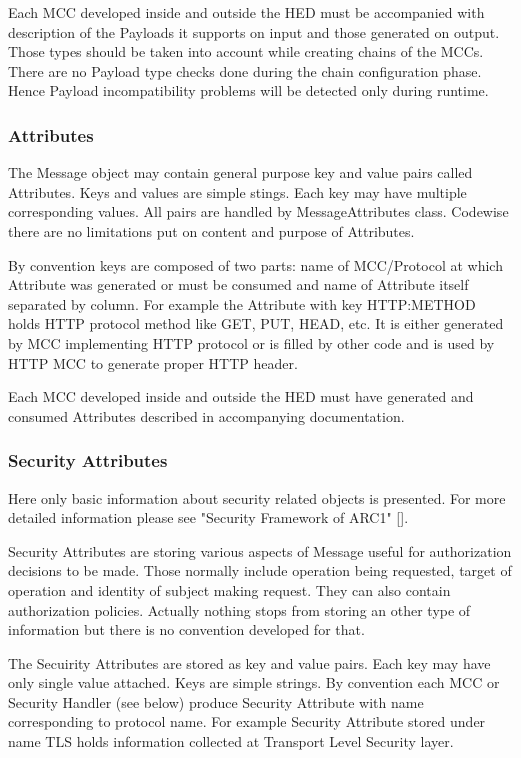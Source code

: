 \documentclass{book}
\begin{document}
Each MCC developed inside and outside the HED must be accompanied with description of the Payloads it supports on input and those generated on output. Those types should be taken into account while creating chains of the MCCs. There are no Payload type checks done during the chain configuration phase. Hence Payload incompatibility problems will be detected only during runtime.

\subsubsection{Attributes}

The Message object may contain general purpose key and value pairs called Attributes. Keys and values are simple stings. Each key may have multiple corresponding values. All pairs are handled by MessageAttributes class. Codewise there are no limitations put on content and purpose of Attributes.

By convention keys are composed of two parts: name of MCC/Protocol at which Attribute was generated or must be consumed and name of Attribute itself separated by column. For example the Attribute with key HTTP:METHOD holds HTTP protocol method like GET, PUT, HEAD, etc. It is either generated by MCC implementing HTTP protocol or is filled by other code and is used by HTTP MCC to generate proper HTTP header.

Each MCC developed inside and outside the HED must have generated and consumed Attributes described in accompanying documentation.


\subsubsection{Security Attributes}

Here only basic information about security related objects is presented. For more detailed information please see "Security Framework of ARC1" [].

Security Attributes are storing various aspects of Message useful for authorization decisions to be made. Those normally include operation being requested, target of operation and identity of subject making request. They can also contain authorization policies. Actually nothing stops from storing an other type of information but there is no convention developed for that.

The Secuirity Attributes are stored as key and value pairs. Each key may have only single value attached. Keys are simple strings. By convention each MCC or Security Handler (see below) produce Security Attribute with name corresponding to protocol name. For example Security Attribute stored under name TLS holds information collected at Transport Level Security layer.
\end{document}
